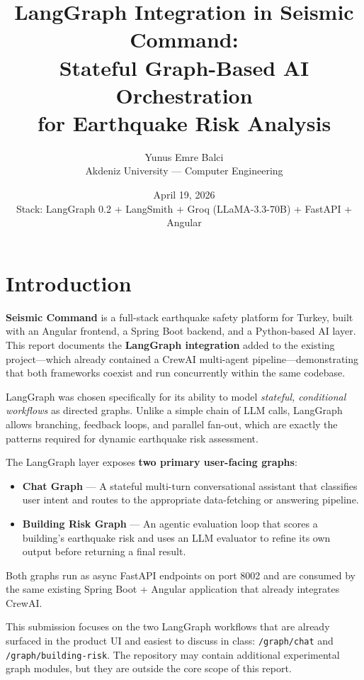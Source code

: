 \documentclass[11pt,a4paper]{article}
\title{\textbf{LangGraph Integration in Seismic Command:\\[0.3em]
Stateful Graph-Based AI Orchestration\\
for Earthquake Risk Analysis}}
\author{Yunus Emre Balci \\ Akdeniz University --- Computer Engineering}
\date{April 19, 2026 \\[0.3em]
\small Stack: LangGraph 0.2 + LangSmith + Groq (LLaMA-3.3-70B) + FastAPI + Angular}
\begin{document}
\maketitle
\thispagestyle{fancy}

\tableofcontents
\newpage

\section{Introduction}

\textbf{Seismic Command} is a full-stack earthquake safety platform for Turkey, built with an Angular frontend, a Spring Boot backend, and a Python-based AI layer. This report documents the \textbf{LangGraph integration} added to the existing project---which already contained a CrewAI multi-agent pipeline---demonstrating that both frameworks coexist and run concurrently within the same codebase.

LangGraph was chosen specifically for its ability to model \textit{stateful, conditional workflows} as directed graphs. Unlike a simple chain of LLM calls, LangGraph allows branching, feedback loops, and parallel fan-out, which are exactly the patterns required for dynamic earthquake risk assessment.

\begin{rationale}
The LangGraph layer exposes \textbf{two primary user-facing graphs}:
\begin{itemize}[leftmargin=1.2em]
    \item \textbf{Chat Graph} --- A stateful multi-turn conversational assistant that classifies user intent and routes to the appropriate data-fetching or answering pipeline.
    \item \textbf{Building Risk Graph} --- An agentic evaluation loop that scores a building's earthquake risk and uses an LLM evaluator to refine its own output before returning a final result.
\end{itemize}
Both graphs run as async FastAPI endpoints on port 8002 and are consumed by the same existing Spring Boot + Angular application that already integrates CrewAI.
\end{rationale}

\begin{designnote}
This submission focuses on the two LangGraph workflows that are already surfaced in the product UI and easiest to discuss in class: \texttt{/graph/chat} and \texttt{/graph/building-risk}. The repository may contain additional experimental graph modules, but they are outside the core scope of this report.
\end{designnote}
\end{document}
